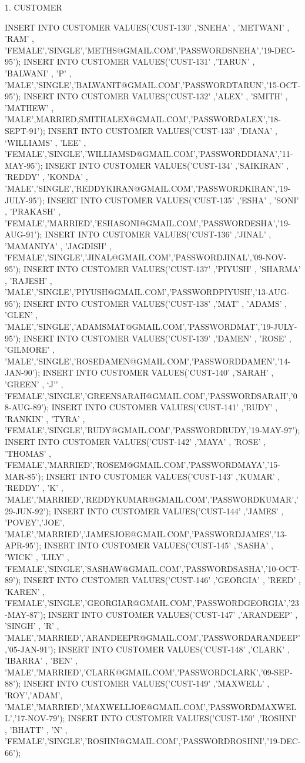 

1.	CUSTOMER

INSERT INTO CUSTOMER VALUES('CUST-130' ,'SNEHA' , 'METWANI' , 'RAM' , 'FEMALE','SINGLE','METHS@GMAIL.COM','PASSWORDSNEHA','19-DEC-95');
INSERT INTO CUSTOMER VALUES('CUST-131' ,'TARUN' , 'BALWANI' , 'P' , 
'MALE','SINGLE','BALWANIT@GMAIL.COM','PASSWORDTARUN','15-OCT-95');
INSERT INTO CUSTOMER VALUES('CUST-132' ,’ALEX’ , 'SMITH' , 'MATHEW' , 'MALE',MARRIED,SMITHALEX@GMAIL.COM','PASSWORDALEX','18-SEPT-91');
INSERT INTO CUSTOMER VALUES('CUST-133' ,’DIANA’ , ‘WILLIAMS’ , 'LEE' , 'FEMALE','SINGLE','WILLIAMSD@GMAIL.COM','PASSWORDDIANA','11-MAY-95');
INSERT INTO CUSTOMER VALUES('CUST-134' ,'SAIKIRAN' , 'REDDY' , 'KONDA' , 'MALE','SINGLE','REDDYKIRAN@GMAIL.COM','PASSWORDKIRAN','19-JULY-95');
INSERT INTO CUSTOMER VALUES('CUST-135' ,'ESHA' , 'SONI' , 'PRAKASH' , 'FEMALE','MARRIED','ESHASONI@GMAIL.COM','PASSWORDESHA','19-AUG-91');
INSERT INTO CUSTOMER VALUES('CUST-136' ,'JINAL' , 'MAMANIYA' , 'JAGDISH' , 'FEMALE','SINGLE','JINAL@GMAIL.COM','PASSWORDJINAL','09-NOV-95');
INSERT INTO CUSTOMER VALUES('CUST-137' ,'PIYUSH' , 'SHARMA' , 'RAJESH' , 'MALE','SINGLE','PIYUSH@GMAIL.COM','PASSWORDPIYUSH','13-AUG-95');
INSERT INTO CUSTOMER VALUES('CUST-138' ,’MAT’ , 'ADAMS' , 'GLEN' , 'MALE','SINGLE','ADAMSMAT@GMAIL.COM','PASSWORDMAT','19-JULY-95');
INSERT INTO CUSTOMER VALUES('CUST-139' ,’DAMEN’ , 'ROSE' , 'GILMORE' , 'MALE','SINGLE','ROSEDAMEN@GMAIL.COM','PASSWORDDAMEN','14-JAN-90');
INSERT INTO CUSTOMER VALUES('CUST-140' ,'SARAH' , 'GREEN' , ‘J’' , 'FEMALE','SINGLE','GREENSARAH@GMAIL.COM','PASSWORDSARAH’,'08-AUG-89');
INSERT INTO CUSTOMER VALUES('CUST-141' ,'RUDY' , 'RANKIN' , 'TYRA' , 'FEMALE','SINGLE','RUDY@GMAIL.COM','PASSWORDRUDY,'19-MAY-97');
INSERT INTO CUSTOMER VALUES('CUST-142' ,'MAYA' , 'ROSE' , 'THOMAS' , 'FEMALE','MARRIED','ROSEM@GMAIL.COM','PASSWORDMAYA','15-MAR-85');
INSERT INTO CUSTOMER VALUES('CUST-143' ,'KUMAR' , 'REDDY' , 'K' , 'MALE','MARRIED','REDDYKUMAR@GMAIL.COM','PASSWORDKUMAR','29-JUN-92');
INSERT INTO CUSTOMER VALUES('CUST-144' ,'JAMES' , 'POVEY','JOE', 'MALE','MARRIED','JAMESJOE@GMAIL.COM','PASSWORDJAMES','13-APR-95');
INSERT INTO CUSTOMER VALUES('CUST-145' ,'SASHA' , 'WICK' , 'LILY' , 'FEMALE','SINGLE','SASHAW@GMAIL.COM','PASSWORDSASHA','10-OCT-89');
INSERT INTO CUSTOMER VALUES('CUST-146' ,'GEORGIA' , 'REED' , 'KAREN' , 'FEMALE','SINGLE','GEORGIAR@GMAIL.COM','PASSWORDGEORGIA','23-MAY-87');
INSERT INTO CUSTOMER VALUES('CUST-147' ,'ARANDEEP' , 'SINGH' , 'R' , 'MALE','MARRIED','ARANDEEPR@GMAIL.COM','PASSWORDARANDEEP','05-JAN-91');
INSERT INTO CUSTOMER VALUES('CUST-148' ,'CLARK' , 'IBARRA' , 'BEN' , 'MALE','MARRIED','CLARK@GMAIL.COM','PASSWORDCLARK','09-SEP-88');
INSERT INTO CUSTOMER VALUES('CUST-149' ,'MAXWELL' , 'ROY','ADAM', 'MALE','MARRIED','MAXWELLJOE@GMAIL.COM','PASSWORDMAXWELL','17-NOV-79');
INSERT INTO CUSTOMER VALUES('CUST-150' ,'ROSHNI' , 'BHATT' , 'N' , 'FEMALE','SINGLE','ROSHNI@GMAIL.COM','PASSWORDROSHNI','19-DEC-66');


